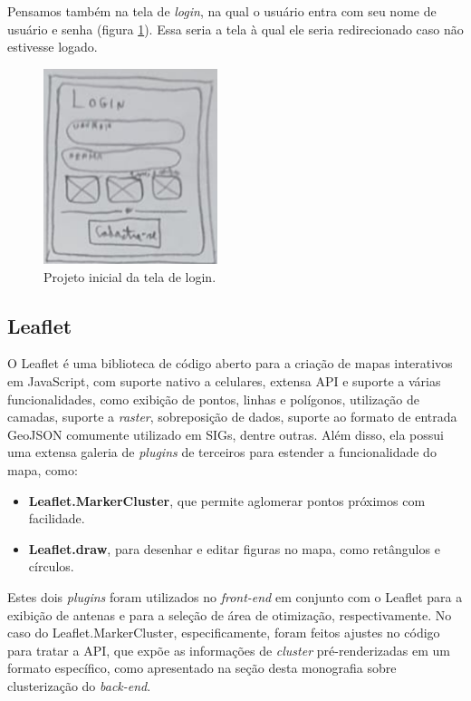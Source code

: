 \documentclass[]{politex}
\begin{document}
Pensamos também na tela de \textit{login}, na qual o usuário entra com seu nome
de usuário e senha (figura \ref{fig:rascunho_login}). Essa seria a tela à qual
ele seria redirecionado caso não estivesse logado.

\begin{figure}[H]
    \centering
    \includegraphics[width=2in]{imagens/rascunho-login}
    \caption{Projeto inicial da tela de login.}
    \label{fig:rascunho_login}
\end{figure}

\subsection{Leaflet}

O Leaflet é uma biblioteca de código aberto para a criação de mapas interativos
em JavaScript, com suporte nativo a celulares, extensa API e suporte a várias
funcionalidades, como exibição de pontos, linhas e polígonos, utilização de
camadas, suporte a \textit{raster}, sobreposição de dados, suporte ao formato de
entrada GeoJSON comumente utilizado em SIGs, dentre outras. Além disso, ela
possui uma extensa galeria de \textit{plugins} de terceiros para estender a
funcionalidade do mapa, como:

\begin{itemize}
\item \textbf{Leaflet.MarkerCluster}, que permite aglomerar pontos próximos com
facilidade.
\item \textbf{Leaflet.draw}, para desenhar e editar figuras no mapa, como
retângulos e círculos.
\end{itemize}

Estes dois \textit{plugins} foram utilizados no \textit{front-end} em conjunto
com o Leaflet para a exibição de antenas e para a seleção de área de otimização,
respectivamente. No caso do Leaflet.MarkerCluster, especificamente, foram feitos
ajustes no código para tratar a API, que expõe as informações de
\textit{cluster} pré-renderizadas em um formato específico, como apresentado na
seção desta monografia sobre clusterização do \textit{back-end}.
\end{document}
